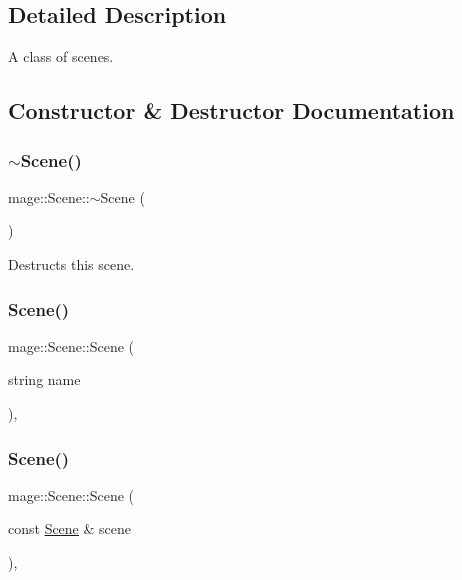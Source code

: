 \subsection{Detailed Description}
A class of scenes. 

\subsection{Constructor \& Destructor Documentation}
\hypertarget{classmage_1_1_scene_adc40910fdca62586659c2961fe7e7f3c}{}\label{classmage_1_1_scene_adc40910fdca62586659c2961fe7e7f3c} 
\subsubsection{\texorpdfstring{$\sim$\+Scene()}{~Scene()}}
{\footnotesize\ttfamily mage\+::\+Scene\+::$\sim$\+Scene (\begin{DoxyParamCaption}{ }\end{DoxyParamCaption})\hspace{0.3cm}{\ttfamily [virtual]}}

Destructs this scene. \hypertarget{classmage_1_1_scene_aaed505892f2a639db47e5d5767f41337}{}\label{classmage_1_1_scene_aaed505892f2a639db47e5d5767f41337} 
\subsubsection{\texorpdfstring{Scene()}{Scene()}\hspace{0.1cm}{\footnotesize\ttfamily [1/3]}}
{\footnotesize\ttfamily mage\+::\+Scene\+::\+Scene (\begin{DoxyParamCaption}\item[{string}]{name }\end{DoxyParamCaption})\hspace{0.3cm}{\ttfamily [explicit]}, {\ttfamily [protected]}}

\hypertarget{classmage_1_1_scene_a88d83ccb2e10549d5370f850b2b4c228}{}\label{classmage_1_1_scene_a88d83ccb2e10549d5370f850b2b4c228} 
\subsubsection{\texorpdfstring{Scene()}{Scene()}\hspace{0.1cm}{\footnotesize\ttfamily [2/3]}}
{\footnotesize\ttfamily mage\+::\+Scene\+::\+Scene (\begin{DoxyParamCaption}\item[{const \hyperlink{classmage_1_1_scene}{Scene} \&}]{scene }\end{DoxyParamCaption})\hspace{0.3cm}{\ttfamily [protected]}, {\ttfamily [delete]}}

